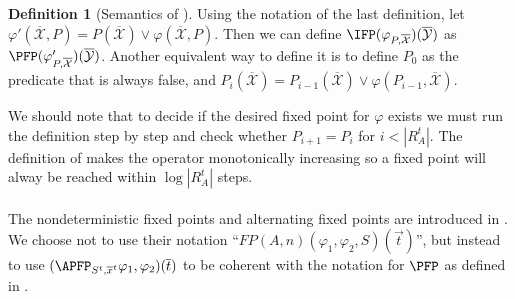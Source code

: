 \documentclass[a4paper,12pt]{article}
\theoremstyle{definition}
\newtheorem{definition}[theorem]{Definition}
\renewcommand{\phi}{\varphi}
\newcommand{\ol}{\overline}
\newcommand{\olmc}[1]{\overline{\mathcal{#1}}}
\begin{document}
\begin{definition}[Semantics of \IFP]
  Using the notation of the last definition, let $\phi'(\olmc
  X,P)=P(\olmc X)\lor\phi(\olmc X,P)$. Then we can define
  $\IFP(\phi_{P,\olmc X})(\olmc Y)$ as $\PFP(\phi'_{P,\olmc X})(\olmc
  Y)$. Another equivalent way to define it is to define $P_0$ as the
  predicate that is always false, and $P_i(\olmc X)=P_{i-1}(\olmc
  X)\lor \phi(P_{i-1},\olmc X)$.
\end{definition}

We should note that to decide if the desired fixed point for $\phi$ exists we
must run the definition step by step and check whether $P_{i+1} =
P_i$ for $i<|R^t_A|$.  The
definition of \IFP{} makes the operator monotonically increasing so a
fixed point will alway be reached within $\log |R^t_A|$ steps.

\paragraph{}
The nondeterministic fixed points and alternating fixed points are
introduced in \cite{nfp}. We choose not to use their notation
``$FP(A,n)(\phi_{1},\phi_{2},S)(\vec t)$'', but instead to use
$(\APFP_{S^{t},\ol x^{t}}\phi_{1},\phi_{2})(\ol t)$ to be coherent
with the notation for $\PFP$ as defined in \cite{imm}.
\end{document}
